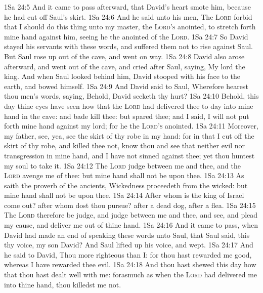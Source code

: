 \vs 1Sa 24:5 And it came to pass afterward, that David's heart smote him, because he had cut off Saul's skirt.
\vs 1Sa 24:6 And he said unto his men, The \textsc{Lord} forbid that I should do this thing unto my master, the \textsc{Lord's} anointed, to stretch forth mine hand against him, seeing he  the anointed of the \textsc{Lord}.
\vs 1Sa 24:7 So David stayed his servants with these words, and suffered them not to rise against Saul. But Saul rose up out of the cave, and went on  way.
\vs 1Sa 24:8 David also arose afterward, and went out of the cave, and cried after Saul, saying, My lord the king. And when Saul looked behind him, David stooped with his face to the earth, and bowed himself.
\vs 1Sa 24:9 And David said to Saul, Wherefore hearest thou men's words, saying, Behold, David seeketh thy hurt?
\vs 1Sa 24:10 Behold, this day thine eyes have seen how that the \textsc{Lord} had delivered thee to day into mine hand in the cave: and  bade  kill thee: but  spared thee; and I said, I will not put forth mine hand against my lord; for he  the \textsc{Lord's} anointed.
\vs 1Sa 24:11 Moreover, my father, see, yea, see the skirt of thy robe in my hand: for in that I cut off the skirt of thy robe, and killed thee not, know thou and see that  neither evil nor transgression in mine hand, and I have not sinned against thee; yet thou huntest my soul to take it.
\vs 1Sa 24:12 The \textsc{Lord} judge between me and thee, and the \textsc{Lord} avenge me of thee: but mine hand shall not be upon thee.
\vs 1Sa 24:13 As saith the proverb of the ancients, Wickedness proceedeth from the wicked: but mine hand shall not be upon thee.
\vs 1Sa 24:14 After whom is the king of Israel come out? after whom dost thou pursue? after a dead dog, after a flea.
\vs 1Sa 24:15 The \textsc{Lord} therefore be judge, and judge between me and thee, and see, and plead my cause, and deliver me out of thine hand.
\vs 1Sa 24:16 And it came to pass, when David had made an end of speaking these words unto Saul, that Saul said,  this thy voice, my son David? And Saul lifted up his voice, and wept.
\vs 1Sa 24:17 And he said to David, Thou  more righteous than I: for thou hast rewarded me good, whereas I have rewarded thee evil.
\vs 1Sa 24:18 And thou hast shewed this day how that thou hast dealt well with me: forasmuch as when the \textsc{Lord} had delivered me into thine hand, thou killedst me not.
